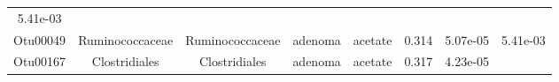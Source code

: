 \documentclass[11pt,]{article}
\begin{document}
\begin{longtable}[]{@{}cccccccc@{}}
\begin{minipage}[t]{0.08\columnwidth}
5.41e-03\strut
\end{minipage}\tabularnewline
\begin{minipage}[t]{0.08\columnwidth}\centering\strut
Otu00049\strut
\end{minipage} & \begin{minipage}[t]{0.15\columnwidth}\centering\strut
Ruminococcaceae\strut
\end{minipage} & \begin{minipage}[t]{0.15\columnwidth}\centering\strut
Ruminococcaceae\strut
\end{minipage} & \begin{minipage}[t]{0.08\columnwidth}\centering\strut
adenoma\strut
\end{minipage} & \begin{minipage}[t]{0.09\columnwidth}\centering\strut
acetate\strut
\end{minipage} & \begin{minipage}[t]{0.07\columnwidth}\centering\strut
0.314\strut
\end{minipage} & \begin{minipage}[t]{0.08\columnwidth}\centering\strut
5.07e-05\strut
\end{minipage} & \begin{minipage}[t]{0.08\columnwidth}\centering\strut
5.41e-03\strut
\end{minipage}\tabularnewline
\begin{minipage}[t]{0.08\columnwidth}\centering\strut
Otu00167\strut
\end{minipage} & \begin{minipage}[t]{0.15\columnwidth}\centering\strut
Clostridiales\strut
\end{minipage} & \begin{minipage}[t]{0.15\columnwidth}\centering\strut
Clostridiales\strut
\end{minipage} & \begin{minipage}[t]{0.08\columnwidth}\centering\strut
adenoma\strut
\end{minipage} & \begin{minipage}[t]{0.09\columnwidth}\centering\strut
acetate\strut
\end{minipage} & \begin{minipage}[t]{0.07\columnwidth}\centering\strut
0.317\strut
\end{minipage} & \begin{minipage}[t]{0.08\columnwidth}\centering\strut
4.23e-05\strut
\end{minipage} & \begin{minipage}[t]{0.08\columnwidth}\centering\strut

\end{minipage}
\end{longtable}
\end{document}
